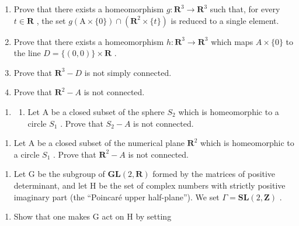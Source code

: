 \begin{enumerate}
\def\labelenumi{\alph{enumi})}
\item
  Prove that there exists a homeomorphism \(g \colon \mathbf{R}^3 \to \mathbf{R}^3\) such that, for every \(t \in \mathbf{R}\) , the set \(g(\mathrm{A} \times \{0\}) \cap (\mathbf{R}^2 \times \{t\})\) is reduced to a single element.
\item
  Prove that there exists a homeomorphism \(h: \mathbf{R}^{3} \to \mathbf{R}^{3}\) which maps \(A \times \{0\}\) to the line \(D = \{(0,0)\} \times \mathbf{R}\) .
\item
  Prove that \(\mathbf{R}^{3} - D\) is not simply connected.
\item
  Prove that \(\mathbf{R}^{2} - A\) is not connected.
\end{enumerate}

\begin{enumerate}
\def\labelenumi{\arabic{enumi})}
\setcounter{enumi}{3}
\tightlist
\item
  \begin{enumerate}
  \def\labelenumii{\alph{enumii})}
  \tightlist
  \item
    Let A be a closed subset of the sphere \(S_{2}\) which is homeomorphic to a circle \(S_{1}\) . Prove that \(S_{2}-A\) is not connected.
  \end{enumerate}
\end{enumerate}

\begin{enumerate}
\def\labelenumi{\alph{enumi})}
\setcounter{enumi}{1}
\tightlist
\item
  Let A be a closed subset of the numerical plane \(\mathbf{R}^{2}\) which is homeomorphic to a circle \(S_{1}\) . Prove that \(\mathbf{R}^{2}-A\) is not connected.
\end{enumerate}

\begin{enumerate}
\def\labelenumi{\arabic{enumi})}
\setcounter{enumi}{4}
\tightlist
\item
  Let G be the subgroup of \(\mathbf{GL}(2,\mathbf{R})\) formed by the matrices of positive determinant, and let H be the set of complex numbers with strictly positive imaginary part (the “Poincaré upper half-plane”). We set \(\Gamma = \mathbf{SL}(2,\mathbf{Z})\) .
\end{enumerate}

\begin{enumerate}
\def\labelenumi{\alph{enumi})}
\tightlist
\item
  Show that one makes G act on H by setting
\end{enumerate}


